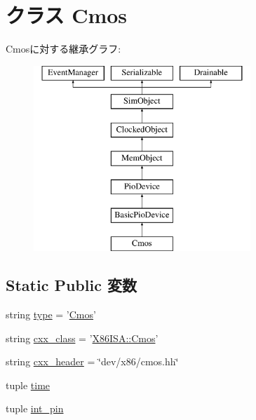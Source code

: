 \hypertarget{classCmos_1_1Cmos}{
\section{クラス Cmos}
\label{classCmos_1_1Cmos}
}
Cmosに対する継承グラフ:\begin{figure}[H]
\begin{center}
\leavevmode
\includegraphics[height=7cm]{classCmos_1_1Cmos}
\end{center}
\end{figure}
\subsection*{Static Public 変数}
\begin{DoxyCompactItemize}
\item 
string \hyperlink{classCmos_1_1Cmos_acce15679d830831b0bbe8ebc2a60b2ca}{type} = '\hyperlink{classCmos_1_1Cmos}{Cmos}'
\item 
string \hyperlink{classCmos_1_1Cmos_a58cd55cd4023648e138237cfc0822ae3}{cxx\_\-class} = '\hyperlink{classX86ISA_1_1Cmos}{X86ISA::Cmos}'
\item 
string \hyperlink{classCmos_1_1Cmos_a17da7064bc5c518791f0c891eff05fda}{cxx\_\-header} = \char`\"{}dev/x86/cmos.hh\char`\"{}
\item 
tuple \hyperlink{classCmos_1_1Cmos_a429c35172fbcb8b1788bead147e4719b}{time}
\item 
tuple \hyperlink{classCmos_1_1Cmos_a3e36d424287a16839b81d9c82d52c36a}{int\_\-pin}
\end{DoxyCompactItemize}



